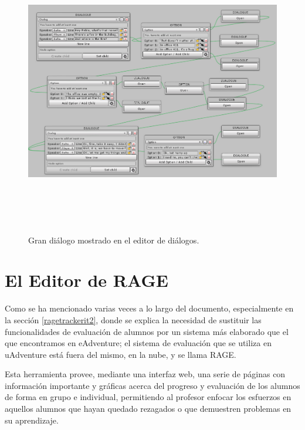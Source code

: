 \begin{figure}[h!]
	\centerline{\includegraphics[height=5in]{figures/it3/big-dialog.png}}
	\caption[Gran diálogo - Editor de Diálogos]{Gran diálogo mostrado en el editor de diálogos.}
	\label{big-dialog-it3}
\end{figure}

\newpage

\newpage

\section{El Editor de RAGE}
\label{rageeditorit3}

Como se ha mencionado varias veces a lo largo del documento, especialmente en la sección \ref{ragetrackerit2}, donde se explica la necesidad de sustituir las funcionalidades de evaluación de alumnos por un sistema más elaborado que el que encontramos en eAdventure; el sistema de evaluación que se utiliza en uAdventure está fuera del mismo, en la nube, y se llama RAGE.

Esta herramienta provee, mediante una interfaz web, una serie de páginas con información importante y gráficas acerca del progreso y evaluación de los alumnos de forma en grupo e individual, permitiendo al profesor enfocar los esfuerzos en aquellos alumnos que hayan quedado rezagados o que demuestren problemas en su aprendizaje.


